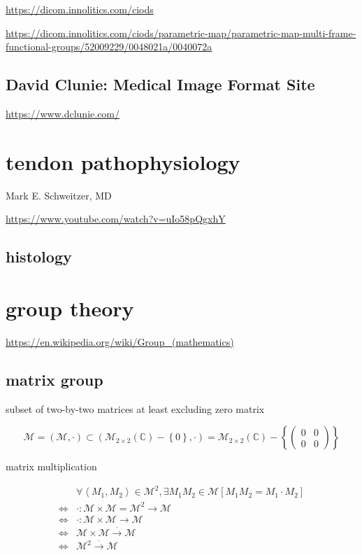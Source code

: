 \documentclass[
]{book}
\theoremstyle{definition}
\theoremstyle{definition}
\theoremstyle{definition}
\theoremstyle{definition}
\theoremstyle{remark}
\begin{document}
\url{https://dicom.innolitics.com/ciods}

\url{https://dicom.innolitics.com/ciods/parametric-map/parametric-map-multi-frame-functional-groups/52009229/0048021a/0040072a}

\section{David Clunie: Medical Image Format Site}\label{david-clunie-medical-image-format-site}

\url{https://www.dclunie.com/}

\chapter{tendon pathophysiology}\label{tendon-pathophysiology}

Mark E. Schweitzer, MD

\url{https://www.youtube.com/watch?v=uIo58pQgxhY}

\section{histology}\label{histology}

\chapter{group theory}\label{group-theory}

\url{https://en.wikipedia.org/wiki/Group_(mathematics)}

\section{matrix group}\label{matrix-group}

subset of two-by-two matrices at least excluding zero matrix

\[
\mathcal{M}=\left(\mathcal{M},\cdot\right)\subset\left(\mathcal{M}_{2\times2}\left(\mathbb{C}\right)-\left\{ 0\right\} ,\cdot\right)=\mathcal{M}_{2\times2}\left(\mathbb{C}\right)-\left\{ \begin{pmatrix}0 & 0\\
0 & 0
\end{pmatrix}\right\} 
\]

matrix multiplication

\[
\begin{aligned}
 & \forall\left\langle M_{{\scriptscriptstyle 1}},M_{{\scriptscriptstyle 2}}\right\rangle \in\mathcal{M}^{2},\exists M_{{\scriptscriptstyle 1}}M_{{\scriptscriptstyle 2}}\in\mathcal{M}\left[M_{{\scriptscriptstyle 1}}M_{{\scriptscriptstyle 2}}=M_{{\scriptscriptstyle 1}}\cdot M_{{\scriptscriptstyle 2}}\right]\\
\Leftrightarrow & \cdot:\mathcal{M}\times\mathcal{M}=\mathcal{M}^{2}\rightarrow\mathcal{M}\\
\Leftrightarrow & \cdot:\mathcal{M}\times\mathcal{M}\rightarrow\mathcal{M}\\
\Leftrightarrow & \mathcal{M}\times\mathcal{M}\overset{\cdot}{\rightarrow}\mathcal{M}\\
\Leftrightarrow & \mathcal{M}^{2}\overset{\cdot}{\rightarrow}\mathcal{M}
\end{aligned}
\]
\end{document}
